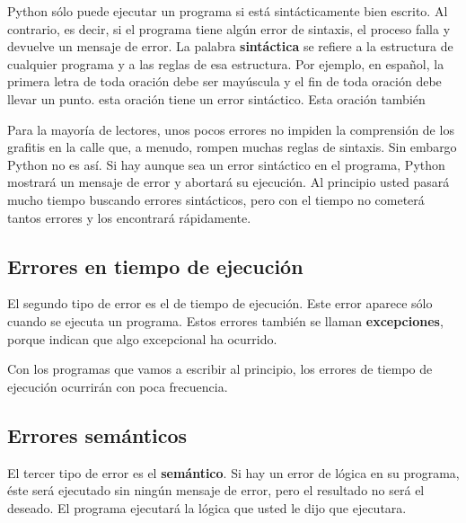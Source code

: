  

Python sólo puede ejecutar un programa si está sintácticamente bien
escrito. Al contrario, es decir, si el programa tiene algún error
de sintaxis, el proceso falla y devuelve un mensaje de error. La palabra
\textbf{sintáctica} se refiere a la estructura de cualquier programa
y a las reglas de esa estructura.  Por ejemplo,
en español, la primera letra de toda oración debe ser mayúscula y
el fin de toda oración debe llevar un punto. esta oración tiene un
error sintáctico. Esta oración también

Para la mayoría de lectores, unos pocos errores no impiden la comprensión
de los grafitis en la calle que, a menudo, rompen muchas reglas de
sintaxis. Sin embargo Python no es así. Si hay aunque sea un error
sintáctico en el programa, Python mostrará un mensaje de error y abortará
su ejecución. Al principio usted pasará mucho tiempo buscando errores
sintácticos, pero con el tiempo no cometerá tantos errores y los encontrará
rápidamente.

\subsection{Errores en tiempo de ejecución}

\label{runtime}  
  

El segundo tipo de error es el de tiempo de ejecución. Este error
aparece sólo cuando se ejecuta un programa. Estos errores también
se llaman \textbf{excepciones}, porque indican que algo excepcional
ha ocurrido.

Con los programas que vamos a escribir al principio, los errores de
tiempo de ejecución ocurrirán con poca frecuencia.

\subsection{Errores semánticos}

  

El tercer tipo de error es el \textbf{semántico}. Si hay un error
de lógica en su programa, éste será ejecutado sin ningún mensaje de
error, pero el resultado no será el deseado. El programa ejecutará
la lógica que usted le dijo que ejecutara.

